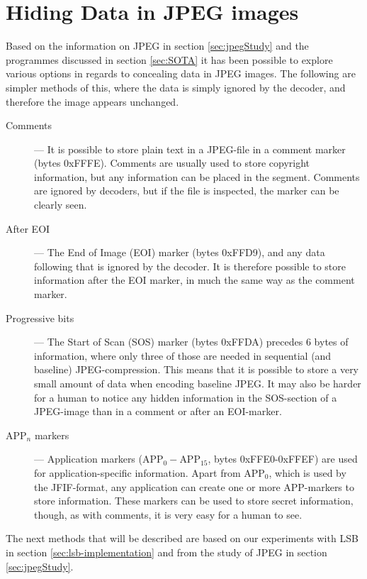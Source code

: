 
\section{Hiding Data in JPEG images}

Based on the information on JPEG in section \ref{sec:jpegStudy} and the programmes discussed in section \ref{sec:SOTA} it has been possible to explore various options in regards to concealing data in JPEG images.
The following are simpler methods of this, where the data is simply ignored by the decoder, and therefore the image appears unchanged.

\begin{description}
	\item[Comments] ---
	It is possible to store plain text in a JPEG-file in a comment marker (bytes 0xFFFE).
	Comments are usually used to store copyright information, but any information can be placed in the segment.
	Comments are ignored by decoders, but if the file is inspected, the marker can be clearly seen.

	\item[After EOI] ---
	The End of Image (EOI) marker (bytes 0xFFD9), and any data following that is ignored by the decoder.
	It is therefore possible to store information after the EOI marker, in much the same way as the comment marker.

	\item[Progressive bits]	---
	The Start of Scan (SOS) marker (bytes 0xFFDA) precedes 6 bytes of information, where only three of those are needed in sequential (and baseline) JPEG-compression.
	This means that it is possible to store a very small amount of data when encoding baseline JPEG.
	It may also be harder for a human to notice any hidden information in the SOS-section of a JPEG-image than in a comment or after an EOI-marker.

	\item[APP$_n$ markers] ---
	Application markers (APP$_0-$APP$_{15}$, bytes 0xFFE0-0xFFEF) are used for application-specific information.
	Apart from APP$_0$, which is used by the JFIF-format, any application can create one or more APP-markers to store information.
	These markers can be used to store secret information, though, as with comments, it is very easy for a human to see.
\end{description}

\noindent The next methods that will be described are based on our experiments with LSB in section \ref{sec:lsb-implementation} and from the study of JPEG in section \ref{sec:jpegStudy}.

